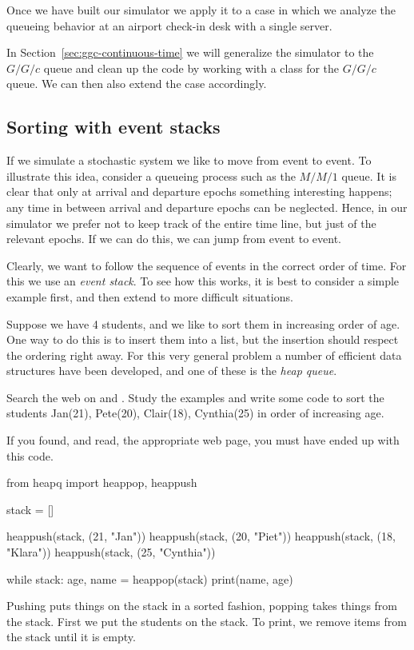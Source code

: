 Once we have built our simulator we apply it to a case in which we analyze the queueing behavior at an airport check-in desk with a single server.

In Section~\ref{sec:ggc-continuous-time} we will generalize the simulator to the $G/G/c$ queue and clean up the code by working with a class for the $G/G/c$ queue. We can then also extend the case accordingly. 


\subsection{Sorting with event stacks}
\label{sec:event-stacks}

If we simulate a stochastic system we like to move from event to event.
To illustrate this idea, consider a queueing process such as the $M/M/1$ queue.
It is clear that only at arrival and departure epochs something interesting happens; any time in between arrival and departure epochs can be neglected.
Hence, in our simulator we prefer not to keep track of the entire time line, but just of the relevant epochs.
If we can do this, we can jump from event to event.

Clearly, we want to follow the sequence of events in the correct order of time.
For this we use an \emph{event stack}.
To see how this works, it is best to consider a simple example first, and then extend to more difficult situations.

Suppose we have 4 students, and we like to sort them in increasing order of age.
One way to do this is to insert them into a list, but the insertion should respect the ordering right away.
For this very general problem a number of efficient data structures have been developed, and one of these is the \emph{heap queue}.

\begin{exercise}
  Search the web on  and . Study the examples and write some code to sort the students Jan(21), Pete(20), Clair(18), Cynthia(25) in order of increasing age.

  \begin{solution}
If you found, and read, the appropriate web page, you must have ended up with this code.
\begin{pyverbatim}
from heapq import heappop, heappush

stack = []

heappush(stack, (21, "Jan"))
heappush(stack, (20, "Piet"))
heappush(stack, (18, "Klara"))
heappush(stack, (25, "Cynthia"))

while stack:
    age, name = heappop(stack)
    print(name, age)

  \end{pyverbatim}

Pushing puts things on the stack in a sorted fashion, popping takes things from the stack. First we put the students on the stack. To print, we remove items from the stack until it is empty.
\end{solution}
  
\end{exercise}



